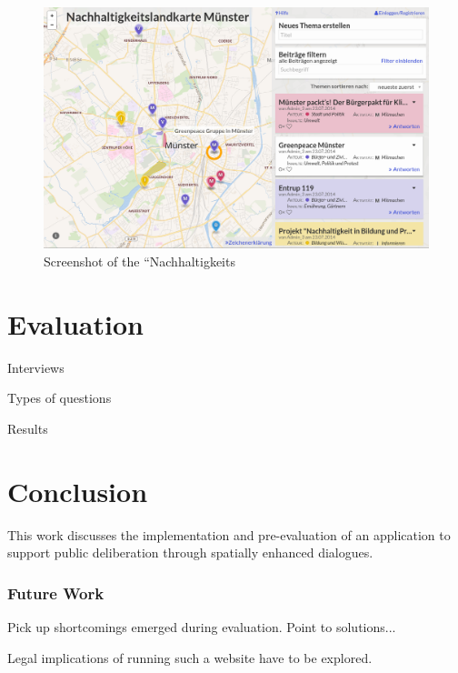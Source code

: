 \documentclass{sigchi}
\begin{document}
\begin{figure}[!h]
\centering
\includegraphics[width=0.9\columnwidth]{screenshot}
\caption{Screenshot of the ``Nachhaltigkeits}
\label{fig:screenshot}
\end{figure}


\section{Evaluation}

Interviews

Types of questions

Results

\section{Conclusion}

This work discusses the implementation and pre-evaluation of an application to support public deliberation through spatially enhanced dialogues.

\subsubsection{Future Work}
Pick up shortcomings emerged during evaluation. Point to solutions...

Legal implications of running such a website have to be explored.


\end{document}
